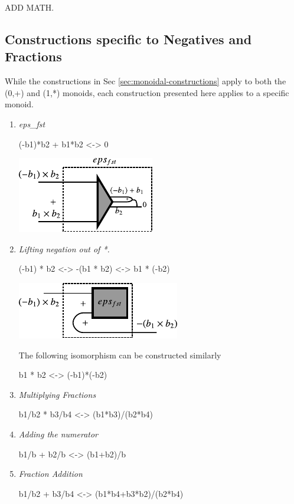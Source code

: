 \documentclass[preprint]{sigplanconf}
\begin{document}
ADD MATH. 

\subsection{Constructions specific to Negatives and Fractions}
\label{sec:specific-constructions}

While the constructions in Sec \ref{sec:monoidal-constructions} apply
to both the {{(0,+)}} and {{(1,*)}} monoids, each construction
presented here applies to a specific monoid. 

\begin{enumerate}

\item 
\emph{ {{eps_{fst} }} }

{{(-b1)*b2 + b1*b2 <-> 0}}

\begin{center}
  \includegraphics{diagrams/eps_fst.pdf}
\end{center}

\item 
\emph{Lifting negation out of {{*}}. }

{{(-b1) * b2 <-> -(b1 * b2) <-> b1 * (-b2)}}

\begin{center}
  \includegraphics{diagrams/mult_neg.pdf}
\end{center}

The following isomorphism can be constructed similarly 

{{b1 * b2 <-> (-b1)*(-b2)}}





\item 
\emph{Multiplying Fractions}

{{b1/b2 * b3/b4 <-> (b1*b3)/(b2*b4)}}


\item 
\emph{Adding the numerator}

{{b1/b + b2/b <-> (b1+b2)/b}}

\item 
\emph{Fraction Addition}

{{b1/b2 + b3/b4 <-> (b1*b4+b3*b2)/(b2*b4) }}

\end{enumerate}
\end{document}
